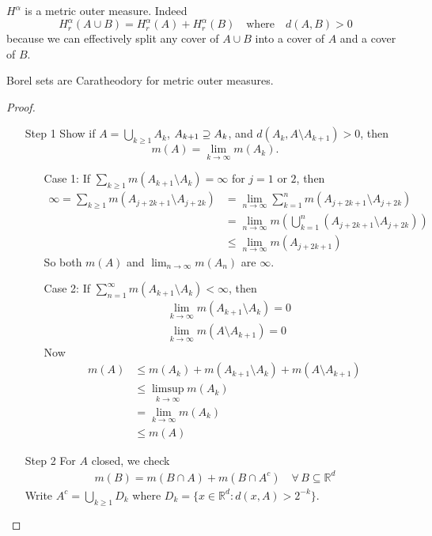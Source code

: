 \begin{example}
	$H^{\alpha}$ is a metric outer measure. Indeed
	\[
		H_{r}^{\alpha}(A \cup B) = H_{r}^{\alpha}(A) + H_{r}^{\alpha}(B) \quad \text{where} \quad d(A,B) > 0
	\]
	because we can effectively split any cover of $A \cup B$ into a cover of $A$ and a cover of $B$.
\end{example}

\begin{lemma}
	Borel sets are Caratheodory for metric outer measures.
\end{lemma}

\begin{proof} \hfill
	\begin{enumerate}
		\item[Step 1] Show if $A = \bigcup_{k \geq 1} A_k$, $A_{k+1} \supseteq A_k$,
			and $d(A_k, A \setminus A_{k+1}) >0$, then 
			\[
				m(A) = \lim_{k \to \infty} m(A_k).
			\]
			\begin{enumerate}
				\item[Case 1:]
					If $\sum_{k \geq 1} m(A_{k+1} \setminus A_k) = \infty$ for $j=1$ or $2$,
					then
					\begin{align*}
						\infty = \sum_{k \geq 1} m(A_{j+2k+1} \setminus A_{j + 2k})
						& = \lim_{n \to \infty} \sum_{k = 1}^{n} m(A_{j+2k+1} \setminus A_{j + 2k}) \\
						& = \lim_{n \to \infty} m \left(\bigcup_{k = 1}^{n} (A_{j+2k+1} \setminus A_{j + 2k})\right) \\
						& \leq \lim_{n \to \infty} m(A_{j+2k+1})
					\end{align*}
					So both $m(A)$ and $\lim_{n \to \infty} m(A_n)$ are $\infty$.

				\item[Case 2:]
					If $\sum_{n=1}^{\infty} m(A_{k+1} \setminus A_{k}) < \infty$, then
					\begin{align*}
					& \lim_{k \to \infty}  m(A_{k+1} \setminus A_{k}) = 0 \\
					& \lim_{k \to \infty}  m(A \setminus A_{k+1}) = 0
					\end{align*}
					Now
					\begin{align*}
						m(A) &\leq m(A_{k}) + m(A_{k+1} \setminus A_{k}) + m(A \setminus A_{k+1}) \\
							 &\leq \limsup_{k \to \infty} m(A_{k}) \\
							 &= \lim_{k \to \infty} m(A_{k}) \\
							 &\leq m(A)
					\end{align*}
			\end{enumerate}
		\item[Step 2] For $A$ closed, we check
			\begin{align*}
			m(B) = m(B \cap A) + m(B \cap A^{c}) \quad \forall \, B \subseteq \mathbb{R}^d
			\end{align*}
			Write $A^{c} = \bigcup_{k \geq 1} D_k$ where $D_{k} = \{x \in \mathbb{R}^d : d(x,A) > 2^{-k} \}$.


\end{enumerate}
\end{proof}
